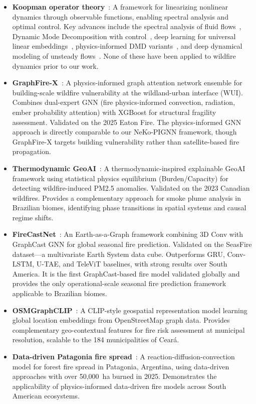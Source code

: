 \documentclass[11pt,twocolumn,a4paper]{article}
\begin{document}
\begin{itemize}
  \item \textbf{Koopman operator theory}~\cite{koopman1931,brunton2021}: A framework for linearizing nonlinear dynamics through observable functions, enabling spectral analysis and optimal control. Key advances include the spectral analysis of fluid flows~\cite{rowley2009,mezic2013}, Dynamic Mode Decomposition with control~\cite{proctor2016}, deep learning for universal linear embeddings~\cite{lusch2018,takeishi2017}, physics-informed DMD variants~\cite{baddoo2023}, and deep dynamical modeling of unsteady flows~\cite{morton2019}. None of these have been applied to wildfire dynamics prior to our work.\\
  \item \textbf{GraphFire-X}~\cite{esparza2025}: A physics-informed graph attention network ensemble for building-scale wildfire vulnerability at the wildland-urban interface (WUI). Combines dual-expert GNN (fire physics-informed convection, radiation, ember probability attention) with XGBoost for structural fragility assessment. Validated on the 2025 Eaton Fire. The physics-informed GNN approach is directly comparable to our NeKo-PIGNN framework, though GraphFire-X targets building vulnerability rather than satellite-based fire propagation.
  \item \textbf{Thermodynamic GeoAI}~\cite{lim2026}: A thermodynamic-inspired explainable GeoAI framework using statistical physics equilibrium (Burden/Capacity) for detecting wildfire-induced PM2.5 anomalies. Validated on the 2023 Canadian wildfires. Provides a complementary approach for smoke plume analysis in Brazilian biomes, identifying phase transitions in spatial systems and causal regime shifts.
  \item \textbf{FireCastNet}~\cite{michail2025}: An Earth-as-a-Graph framework combining 3D Conv with GraphCast GNN for global seasonal fire prediction. Validated on the SeasFire dataset---a multivariate Earth System data cube. Outperforms GRU, Conv-LSTM, U-TAE, and TeleViT baselines, with strong results over South America. It is the first GraphCast-based fire model validated globally and provides the only operational-scale seasonal fire prediction framework applicable to Brazilian biomes.
  \item \textbf{OSMGraphCLIP}~\cite{michail2026_osm}: A CLIP-style geospatial representation model learning global location embeddings from OpenStreetMap graph data. Provides complementary geo-contextual features for fire risk assessment at municipal resolution, scalable to the 184 municipalities of Cear\'{a}.
  \item \textbf{Data-driven Patagonia fire spread}~\cite{becerra2026}: A reaction-diffusion-convection model for forest fire spread in Patagonia, Argentina, using data-driven approaches with over 50,000~ha burned in 2025. Demonstrates the applicability of physics-informed data-driven fire models across South American ecosystems.
\end{itemize}
\end{document}
